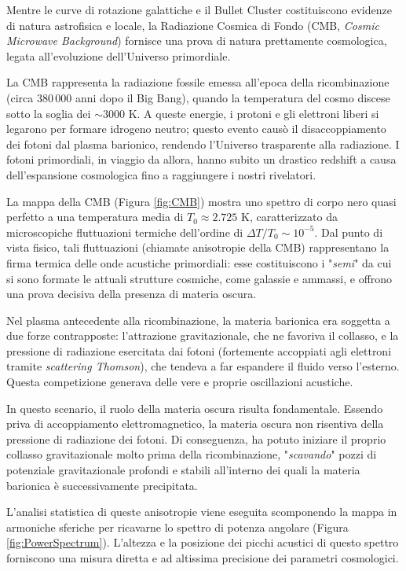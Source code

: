 Mentre le curve di rotazione galattiche e il Bullet Cluster costituiscono evidenze di natura astrofisica e locale, la Radiazione Cosmica di Fondo (CMB, \textit{Cosmic Microwave Background}) fornisce una prova di natura prettamente cosmologica, legata all'evoluzione dell'Universo primordiale. 

La CMB rappresenta la radiazione fossile emessa all'epoca della ricombinazione (circa $380\,000$ anni dopo il Big Bang), quando la temperatura del cosmo discese sotto la soglia dei $\sim 3000\text{ K}$. A queste energie, i protoni e gli elettroni liberi si legarono per formare idrogeno neutro; questo evento causò il disaccoppiamento dei fotoni dal plasma barionico, rendendo l'Universo trasparente alla radiazione. I fotoni primordiali, in viaggio da allora, hanno subito un drastico redshift a causa dell'espansione cosmologica fino a raggiungere i nostri rivelatori.

La mappa della CMB (Figura \ref{fig:CMB}) mostra uno spettro di corpo nero quasi perfetto a una temperatura media di $T_0 \approx 2.725\text{ K}$, caratterizzato da microscopiche fluttuazioni termiche dell'ordine di $\Delta T / T_0 \sim 10^{-5}$. Dal punto di vista fisico, tali fluttuazioni (chiamate anisotropie della CMB) rappresentano la firma termica delle onde acustiche primordiali: esse costituiscono i "\textit{semi}" da cui si sono formate le attuali strutture cosmiche, come galassie e ammassi, e offrono una prova decisiva della presenza di materia oscura.

Nel plasma antecedente alla ricombinazione, la materia barionica era soggetta a due forze contrapposte: l'attrazione gravitazionale, che ne favoriva il collasso, e la pressione di radiazione esercitata dai fotoni (fortemente accoppiati agli elettroni tramite \textit{scattering Thomson}), che tendeva a far espandere il fluido verso l'esterno. Questa competizione generava delle vere e proprie oscillazioni acustiche.

In questo scenario, il ruolo della materia oscura risulta fondamentale. Essendo priva di accoppiamento elettromagnetico, la materia oscura non risentiva della pressione di radiazione dei fotoni. Di conseguenza, ha potuto iniziare il proprio collasso gravitazionale molto prima della ricombinazione, "\textit{scavando}" pozzi di potenziale gravitazionale profondi e stabili all'interno dei quali la materia barionica è successivamente precipitata.

L'analisi statistica di queste anisotropie viene eseguita scomponendo la mappa in armoniche sferiche per ricavarne lo spettro di potenza angolare (Figura \ref{fig:PowerSpectrum}). L'altezza e la posizione dei picchi acustici di questo spettro forniscono una misura diretta e ad altissima precisione dei parametri cosmologici. 


